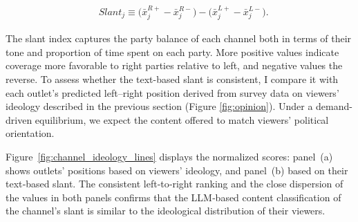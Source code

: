 \documentclass[12pt]{article}
\begin{document}
	
	
	\begin{equation}\label{eq:ideo_index}
		\begin{aligned}
			& Slant_j \equiv \bigl(\bar{x}_j^{R+}-\bar{x}_j^{R-}\bigr)-\bigl(\bar{x}_j^{L+}-\bar{x}_j^{L-}\bigr).
		\end{aligned}
	\end{equation} 


 
The slant index captures the party balance of each channel both in terms of their tone and proportion of time spent on each party. More positive values indicate coverage more favorable to right parties relative to left,  and negative values the reverse.  To assess whether the text-based slant is consistent, I compare it with each outlet’s predicted left–right position derived from survey data on viewers’ ideology described in the previous section (Figure \ref{fig:opinion}). Under a demand-driven equilibrium, we expect the content offered to match viewers' political orientation. 
 

 
 Figure~\ref{fig:channel_ideology_lines} displays the normalized scores: panel~(a) shows outlets' positions based on viewers’ ideology, and panel~(b) based on their text‐based slant. The consistent left‐to‐right ranking and the close dispersion of the values in both panels confirms that the LLM‐based content classification of the channel's slant is similar to  the ideological distribution of their viewers.
		
\end{document}
